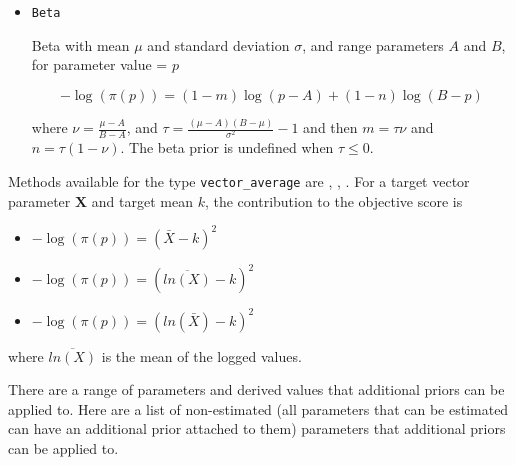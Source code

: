 \begin{itemize}
	\item\texttt{Beta}\label{sec:AdditionalPrior-Beta}

	{Beta with mean $\mu$ and standard deviation $\sigma$, and range parameters $A$ and $B$, for parameter value = $p$}

	\begin{equation}
	- \log \left(\pi \left( p \right) \right) = \left( 1 - m \right) \log \left( p - A \right) + \left( 1 - n \right)\log \left( B - p \right)
	\end{equation}

	where $\nu  = \frac{\mu  - A}{B - A}$, and $\tau = \frac{\left(\mu -A \right)\left(B - \mu \right)}{\sigma ^2} - 1$ and then $m=\tau \nu$ and $n=\tau(1-\nu)$. The beta prior is undefined when $\tau \leq 0$.
\end{itemize}

Methods available for the type \texttt{vector\_average} are , , . For a target vector parameter $\textbf{X}$ and target mean $k$, the contribution to the objective score is

\begin{itemize}
	\item {}

	$- \log \left(\pi \left(p \right) \right) = \left(\bar{X} - k\right)^2$

	\item {}

	$- \log \left(\pi \left(p \right) \right) = \left(\overline{ln\left(X\right)} - k\right)^2$

	\item {}

	$- \log \left(\pi \left(p \right) \right) = \left(ln\left(\bar{X}\right) - k\right)^2$
\end{itemize}

where $\overline{ln\left(X\right)}$ is the mean of the logged values.

There are a range of parameters and derived values that additional priors can be applied to. Here are a list of non-estimated (all parameters that can be estimated can have an additional prior attached to them) parameters that additional priors can be applied to.

